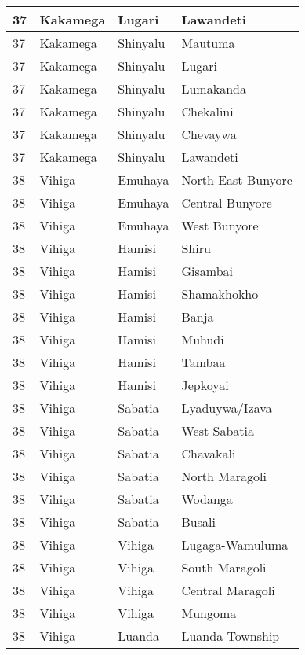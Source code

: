 \begin{table}[!ht]
\begin{tabular}{|l|l|l|l|}
        37 & Kakamega & Lugari & Lawandeti \\ \hline
        37 & Kakamega & Shinyalu & Mautuma \\ \hline
        37 & Kakamega & Shinyalu & Lugari \\ \hline
        37 & Kakamega & Shinyalu & Lumakanda \\ \hline
        37 & Kakamega & Shinyalu & Chekalini \\ \hline
        37 & Kakamega & Shinyalu & Chevaywa \\ \hline
        37 & Kakamega & Shinyalu & Lawandeti \\ \hline
        38 & Vihiga & Emuhaya & North East Bunyore \\ \hline
        38 & Vihiga & Emuhaya & Central Bunyore \\ \hline
        38 & Vihiga & Emuhaya & West Bunyore \\ \hline
        38 & Vihiga & Hamisi & Shiru \\ \hline
        38 & Vihiga & Hamisi & Gisambai \\ \hline
        38 & Vihiga & Hamisi & Shamakhokho \\ \hline
        38 & Vihiga & Hamisi & Banja \\ \hline
        38 & Vihiga & Hamisi & Muhudi \\ \hline
        38 & Vihiga & Hamisi & Tambaa \\ \hline
        38 & Vihiga & Hamisi & Jepkoyai \\ \hline
        38 & Vihiga & Sabatia & Lyaduywa/Izava \\ \hline
        38 & Vihiga & Sabatia & West Sabatia \\ \hline
        38 & Vihiga & Sabatia & Chavakali \\ \hline
        38 & Vihiga & Sabatia & North Maragoli \\ \hline
        38 & Vihiga & Sabatia & Wodanga \\ \hline
        38 & Vihiga & Sabatia & Busali \\ \hline
        38 & Vihiga & Vihiga & Lugaga-Wamuluma \\ \hline
        38 & Vihiga & Vihiga & South Maragoli \\ \hline
        38 & Vihiga & Vihiga & Central Maragoli \\ \hline
        38 & Vihiga & Vihiga & Mungoma \\ \hline
        38 & Vihiga & Luanda & Luanda Township \\ \hline

\end{tabular}
\end{table}
